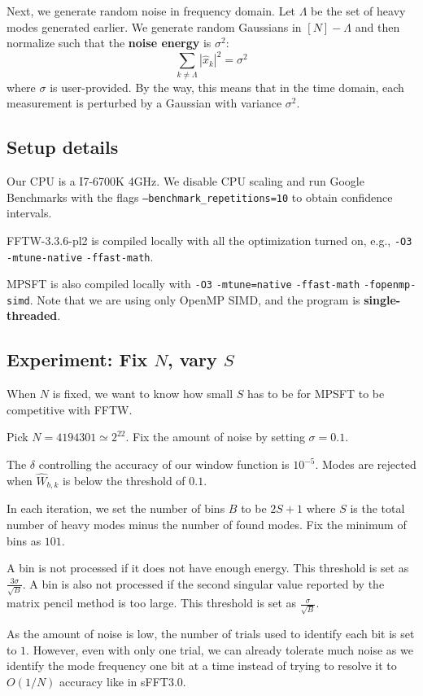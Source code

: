\documentclass[10pt]{article}
\begin{document}
Next, we generate random noise in frequency domain. Let $\Lambda$ be the set of heavy modes generated earlier. We generate random Gaussians in $[N]-\Lambda$ and then normalize such that the \textbf{noise energy} is $\sigma^2$:
$$\sum_{k\neq \Lambda} |\hat{x}_k|^2 = \sigma^2$$
where $\sigma$ is user-provided. By the way, this means that in the time domain, each measurement is perturbed by a Gaussian with variance $\sigma^2$.

\subsection{Setup details}
Our CPU is a I7-6700K 4GHz. We disable CPU scaling and run Google Benchmarks with the flags \texttt{--benchmark\_repetitions=10} to obtain confidence intervals.

FFTW-3.3.6-pl2 is compiled locally with all the optimization turned on, e.g., \texttt{-O3} \texttt{-mtune-native} \texttt{-ffast-math}.

MPSFT is also compiled locally with \texttt{-O3} \texttt{-mtune=native} \texttt{-ffast-math} \texttt{-fopenmp-simd}. Note that we are using only OpenMP SIMD, and the program is \textbf{single-threaded}.

\subsection{Experiment: Fix $N$, vary $S$}
When $N$ is fixed, we want to know how small $S$ has to be for MPSFT to be competitive with FFTW.

Pick $N=4194301\simeq 2^{22}$. Fix the amount of noise by setting $\sigma=0.1$.

The $\delta$ controlling the accuracy of our window function is $10^{-5}$. Modes are rejected when $\hat{W}_{b,k}$ is below the threshold of $0.1$.

In each iteration, we set the number of bins $B$ to be $2S+1$ where $S$ is the total number of heavy modes minus the number of found modes. Fix the minimum of bins as $101$.

A bin is not processed if it does not have enough energy. This threshold is set as $\frac{3\sigma}{\sqrt{B}}$. A bin is also not processed if the second singular value reported by the matrix pencil method is too large. This threshold is set as $\frac{\sigma}{\sqrt{B}}$.

As the amount of noise is low, the number of trials used to identify each bit is set to $1$. However, even with only one trial, we can already tolerate much noise as we identify the mode frequency one bit at a time instead of trying to resolve it to $O(1/N)$ accuracy like in sFFT3.0.
\end{document}
